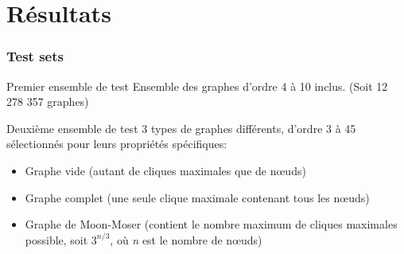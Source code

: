 \documentclass{beamer}
\begin{document}
\section{Résultats}
\begin{frame}
  \frametitle{Test sets}
  \begin{block}{Premier ensemble de test}
    Ensemble des graphes d'ordre 4 à 10 inclus. (Soit 12 278 357 graphes)
  \end{block}
  \begin{block}{Deuxième ensemble de test}
    3 types de graphes différents, d'ordre 3 à 45 sélectionnés pour leurs propriétés spécifiques:
    \begin{itemize}
      \item Graphe vide (autant de cliques maximales que de nœuds)
      \item Graphe complet (une seule clique maximale contenant tous les nœuds)
      \item Graphe de Moon-Moser (contient le nombre maximum de cliques maximales possible, soit \(3^{n/3}\), où \emph{n} est le nombre de nœuds)
    \end{itemize}
  \end{block}
\end{frame}
\end{document}
